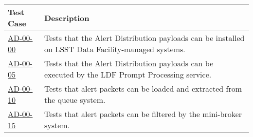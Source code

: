 \begin{longtable} {|p{}|p{}|}\hline
\textbf{Test Case}  & \textbf{Description} \\\hline

\hyperref[ad-00-00]{AD-00-00} & Tests that the Alert Distribution payloads can be installed on LSST Data Facility-managed systems.\\\hline
\hyperref[ad-00-05]{AD-00-05} & Tests that the Alert Distribution payloads can be executed by the LDF Prompt Processing service. \\\hline
\hyperref[ad-00-10]{AD-00-10} & Tests that alert packets can be loaded and extracted from the queue system. \\\hline
\hyperref[ad-00-15]{AD-00-15} & Tests that alert packets can be filtered by the mini-broker system. \\\hline
\end{longtable}
